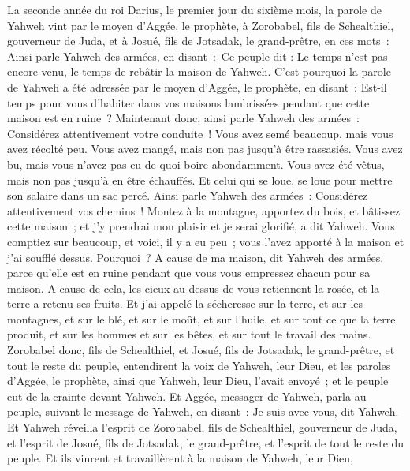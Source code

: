 \begin{multicols}{2}
\VerseOne{}La seconde année du roi Darius, le premier jour du sixième mois, la parole de Yahweh vint par le moyen d'Aggée, le prophète, à Zorobabel, fils de Schealthiel, gouverneur de Juda, et à Josué, fils de Jotsadak, le grand-prêtre, en ces mots~:
Ainsi parle Yahweh des armées, en disant~:~Ce peuple dit : Le temps n'est pas encore venu, le temps de rebâtir la maison de Yahweh.
C'est pourquoi la parole de Yahweh a été adressée par le moyen d'Aggée, le prophète, en disant~:
Est-il temps pour vous d'habiter dans vos maisons lambrissées pendant que cette maison est en ruine~?
Maintenant donc, ainsi parle Yahweh des armées~: Considérez attentivement votre conduite~!
Vous avez semé beaucoup, mais vous avez récolté peu. Vous avez mangé, mais non pas jusqu'à être rassasiés. Vous avez bu, mais vous n'avez pas eu de quoi boire abondamment. Vous avez été vêtus, mais non pas jusqu'à en être échauffés. Et celui qui se loue, se loue pour mettre son salaire dans un sac percé.
Ainsi parle Yahweh des armées~: Considérez attentivement vos chemins~!
Montez à la montagne, apportez du bois, et bâtissez cette maison~; et j'y prendrai mon plaisir et je serai glorifié, a dit Yahweh.
Vous comptiez sur beaucoup, et voici, il y a eu peu~; vous l'avez apporté à la maison et j'ai soufflé dessus. Pourquoi~? A cause de ma maison, dit Yahweh des armées, parce qu'elle est en ruine pendant que vous vous empressez chacun pour sa maison.
A cause de cela, les cieux au-dessus de vous retiennent la rosée, et la terre a retenu ses fruits.
Et j'ai appelé la sécheresse sur la terre, et sur les montagnes, et sur le blé, et sur le moût, et sur l'huile, et sur tout ce que la terre produit, et sur les hommes et sur les bêtes, et sur tout le travail des mains.
Zorobabel donc, fils de Schealthiel, et Josué, fils de Jotsadak, le grand-prêtre, et tout le reste du peuple, entendirent la voix de Yahweh, leur Dieu, et les paroles d'Aggée, le prophète, ainsi que Yahweh, leur Dieu, l'avait envoyé~; et le peuple eut de la crainte devant Yahweh.
Et Aggée, messager de Yahweh, parla au peuple, suivant le message de Yahweh, en disant~: Je suis avec vous, dit Yahweh.
Et Yahweh réveilla l'esprit de Zorobabel, fils de Schealthiel, gouverneur de Juda, et l'esprit de Josué, fils de Jotsadak, le grand-prêtre, et l'esprit de tout le reste du peuple. Et ils vinrent et travaillèrent à la maison de Yahweh, leur Dieu,

\end{multicols}
